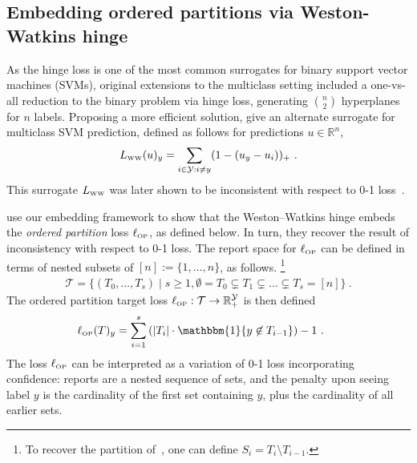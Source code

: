 \documentclass[twoside,11pt]{article}
\newcommand{\reals}{\mathbb{R}}
\newcommand{\LWW}{L_{\text{\tiny WW}}}
\newcommand{\ellOP}{\ell_{\text{\tiny OP}}}
\newcommand{\T}{\mathcal{T}}
\newcommand{\Y}{\mathcal{Y}}
\newcommand{\ones}{\mathbbm{1}}
\newcommand{\Ind}[1]{\ones\{#1\}}
\begin{document}
\subsection{Embedding ordered partitions via Weston-Watkins hinge}
\label{sec:winge}
As the hinge loss is one of the most common surrogates for binary support vector machines (SVMs), original extensions to the multiclass setting included a one-vs-all reduction to the binary problem via hinge loss, generating ${n \choose 2}$ hyperplanes for $n$ labels.
Proposing a more efficient solution, \citet{weston1999support} give an alternate surrogate for multiclass SVM prediction, defined as follows for predictions $u \in \reals^n$,
\begin{equation}\label{eq:ww-hinge}
\LWW(u)_y = \sum_{i \in \Y : i \neq y} (1 - (u_y - u_i))_+~.
\end{equation}
This surrogate $\LWW$ was later shown to be inconsistent with respect to 0-1 loss~\citep{tewari2007consistency,liu2007fisher}.

\citet{wang2020weston} use our embedding framework to show that the Weston--Watkins hinge embeds the \emph{ordered partition} loss $\ellOP$, as defined below.
In turn, they recover the result of inconsistency with respect to 0-1 loss.
The report space for $\ellOP$ can be defined in terms of nested subsets of $[n] := \{1, \ldots, n\}$, as follows.%
\footnote{To recover the partition of~\citet{wang2020weston}, one can define $S_i = T_i \setminus T_{i-1}$.}
\begin{align*}
\T = \{ (T_0,\ldots,T_s) \mid s \geq 1, \emptyset = T_0 \subsetneq T_1 \subsetneq \ldots \subsetneq T_s = [n]\}~.
\end{align*}
\noindent
The ordered partition target loss $\ellOP : \T \to \reals^\Y_+$ is then defined
\begin{align*}
\ellOP(T)_y &= \sum_{i=1}^{s} \left(|T_{i}| \cdot \Ind{y \not \in T_{i-1}} \right) -1~.~
\end{align*}
\noindent
The loss $\ellOP$ can be interpreted as a variation of 0-1 loss incorporating confidence: reports are a nested sequence of sets, and the penalty upon seeing label $y$ is the cardinality of the first set containing $y$, plus the cardinality of all earlier sets.
\end{document}

